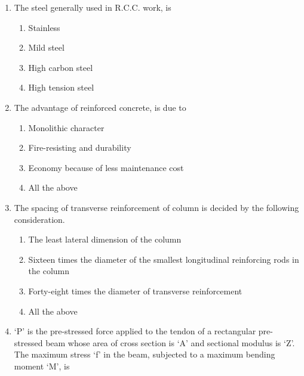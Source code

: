 \documentclass[11pt,a4paper]{article}
\begin{document}
\begin{enumerate}
\begin{enumerate}[label=\Alph*.]
\end{enumerate}
\item{The steel generally used in R.C.C. work, is}
\begin{enumerate}[label=\Alph*.]
\item{Stainless}
\item{Mild steel}
\item{High carbon steel}
\item{High tension steel}
\end{enumerate}
\item{The advantage of reinforced concrete, is due to}
\begin{enumerate}[label=\Alph*.]
\item{Monolithic character}
\item{Fire-resisting and durability}
\item{Economy because of less maintenance cost}
\item{All the above}
\end{enumerate}
\item{The spacing of transverse reinforcement of column is decided by the following consideration.}
\begin{enumerate}[label=\Alph*.]
\item{The least lateral dimension of the column}
\item{Sixteen times the diameter of the smallest longitudinal reinforcing rods in the column}
\item{Forty-eight times the diameter of transverse reinforcement}
\item{All the above}
\end{enumerate}
\item{`P' is the pre-stressed force applied to the tendon of a rectangular pre-stressed beam whose area of cross section is `A' and sectional modulus is `Z'. The maximum stress `f' in the beam, subjected to a maximum bending moment `M', is
}
\\
\end{enumerate}
\end{document}
